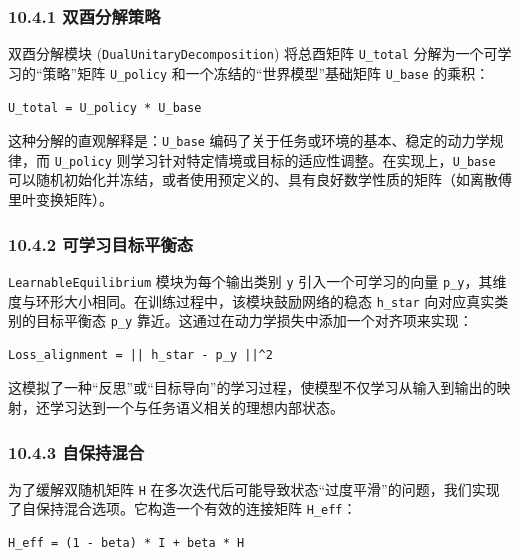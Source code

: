 \documentclass[
  12pt,
]{article}
\begin{document}
\hypertarget{ux53ccux9149ux5206ux89e3ux7b56ux7565}{%
\subsubsection{10.4.1
双酉分解策略}\label{ux53ccux9149ux5206ux89e3ux7b56ux7565}}

双酉分解模块 (\texttt{DualUnitaryDecomposition}) 将总酉矩阵
\texttt{U\_total} 分解为一个可学习的``策略''矩阵 \texttt{U\_policy}
和一个冻结的``世界模型''基础矩阵 \texttt{U\_base} 的乘积：

\begin{verbatim}
U_total = U_policy * U_base
\end{verbatim}

这种分解的直观解释是：\texttt{U\_base}
编码了关于任务或环境的基本、稳定的动力学规律，而 \texttt{U\_policy}
则学习针对特定情境或目标的适应性调整。在实现上，\texttt{U\_base}
可以随机初始化并冻结，或者使用预定义的、具有良好数学性质的矩阵（如离散傅里叶变换矩阵）。

\hypertarget{ux53efux5b66ux4e60ux76eeux6807ux5e73ux8861ux6001}{%
\subsubsection{10.4.2
可学习目标平衡态}\label{ux53efux5b66ux4e60ux76eeux6807ux5e73ux8861ux6001}}

\texttt{LearnableEquilibrium} 模块为每个输出类别 \texttt{y}
引入一个可学习的向量
\texttt{p\_y}，其维度与环形大小相同。在训练过程中，该模块鼓励网络的稳态
\texttt{h\_star} 向对应真实类别的目标平衡态 \texttt{p\_y}
靠近。这通过在动力学损失中添加一个对齐项来实现：

\begin{verbatim}
Loss_alignment = || h_star - p_y ||^2
\end{verbatim}

这模拟了一种``反思''或``目标导向''的学习过程，使模型不仅学习从输入到输出的映射，还学习达到一个与任务语义相关的理想内部状态。

\hypertarget{ux81eaux4fddux6301ux6df7ux5408}{%
\subsubsection{10.4.3 自保持混合}\label{ux81eaux4fddux6301ux6df7ux5408}}

为了缓解双随机矩阵 \texttt{H}
在多次迭代后可能导致状态``过度平滑''的问题，我们实现了自保持混合选项。它构造一个有效的连接矩阵
\texttt{H\_eff}：

\begin{verbatim}
H_eff = (1 - beta) * I + beta * H
\end{verbatim}
\end{document}

